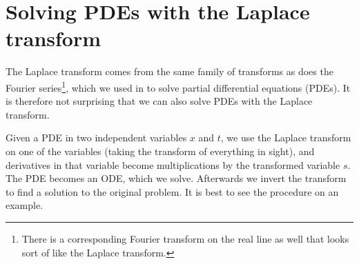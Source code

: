 
\sectionnewpage
\section{Solving PDEs with the Laplace transform}
\label{laplacepde:section}


The Laplace transform comes from the same family of transforms as does the
Fourier series\footnote{There is a corresponding Fourier transform
on the real line as well that looks sort of like the Laplace transform.},
which we used in  to solve partial differential
equations (PDEs).
It is therefore not surprising that we can also solve PDEs with the Laplace
transform.

Given a PDE in two independent variables $x$ and $t$,  we use the
Laplace transform on one of the variables (taking the transform
of everything in sight), and derivatives in that variable become
multiplications by the transformed variable $s$.
The PDE becomes an ODE, which we solve.
Afterwards we invert the transform to find a solution to the original
problem.
It is best to see the procedure on an example.

